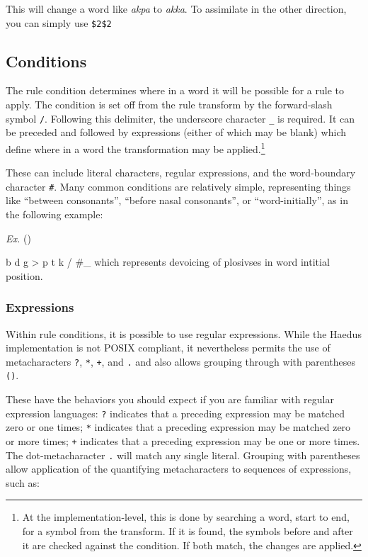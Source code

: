 \documentclass[10pt,letterpaper]{article}
\newcounter{excounter}
\newenvironment{vex}[1]{
	\refstepcounter{excounter}
	\noindent\emph{Ex.} (\arabic{excounter}\label{#1})
	\verbatim
}{\endverbatim}
\begin{document}
\noindent
This will change a word like \emph{akpa} to \emph{akka}. %
To assimilate in the other direction, you can simply use \texttt{\$2\$2}


\subsection{Conditions}
\label{sec:conditions}
The rule condition determines where in a word it will be possible for a rule to apply. The condition is set off from the rule transform by the forward-slash symbol \texttt{/}. Following this delimiter, the underscore character \texttt{\_} is required. It can be preceded and followed by expressions (either of which may be blank) which define where in a word the transformation may be applied.\footnote{At the implementation-level, this is done by searching a word, start to end, for a symbol from the transform. If it is found, the symbols before and after it are checked against the condition. If both match, the changes are applied.}

These can include literal characters, regular expressions, and the word-boundary character \texttt{\#}. %
Many common conditions are relatively simple, representing things like ``between consonants'', ``before nasal consonants'', or ``word-initially'', as in the following example:

\begin{vex}{ex:devoicing}
b d g > p t k / #_
\end{vex}
\noindent
which represents devoicing of plosivses in word intitial position.

\subsubsection{Expressions}
\label{ssub:expressions}
Within rule conditions, it is possible to use regular expressions. While the Haedus implementation is not POSIX compliant, it nevertheless permits the use of metacharacters \texttt{?}, \texttt{*}, \texttt{+}, and \texttt{.} and also allows grouping through with parentheses \texttt{()}.

These have the behaviors you should expect if you are familiar with regular expression languages: \texttt{?} indicates that a preceding expression may be matched zero or one times; \texttt{*} indicates that a preceding expression may be matched zero or more times; \texttt{+} indicates that a preceding expression may be one or more times. The dot-metacharacter \texttt{.} will match any single literal. Grouping with parentheses allow application of the quantifying metacharacters to sequences of expressions, such as: 
\end{document}
